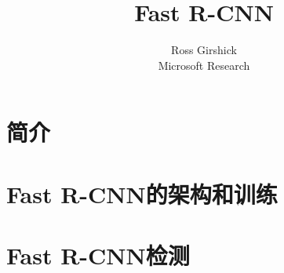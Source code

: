 \documentclass{ctexart}
\title{Fast R-CNN}
\author{Ross Girshick \\ Microsoft Research}
\date{}
\begin{document}
\maketitle
\begin{abstract}
    
\end{abstract}
\section{简介}

\section{Fast R-CNN的架构和训练}

\section{Fast R-CNN检测}

\printbibliography
\end{document}
